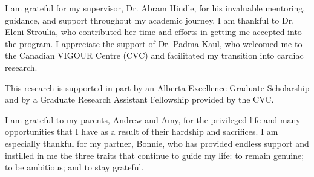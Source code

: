 \documentclass[\main/thesis.tex]{subfiles}
\begin{document}
\begin{acknowledgements} 

I am grateful for my supervisor, Dr. Abram Hindle, for his invaluable mentoring, guidance, and support throughout my academic journey.
I am thankful to Dr. Eleni Stroulia, who contributed her time and efforts in getting me accepted into the program.
I appreciate the support of Dr. Padma Kaul, who welcomed me to the Canadian VIGOUR Centre (CVC) and facilitated my transition into cardiac research.

This research is supported in part by an Alberta Excellence Graduate Scholarship and by a Graduate Research Assistant Fellowship provided by the CVC.

I am grateful to my parents, Andrew and Amy, for the privileged life and many opportunities that I have as a result of their hardship and sacrifices.
I am especially thankful for my partner, Bonnie, who has provided endless support and instilled in me the three traits that continue to guide my life: to remain genuine; to be ambitious; and to stay grateful.

\end{acknowledgements}
\end{document}

